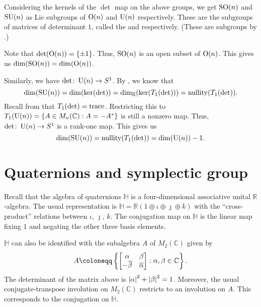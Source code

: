 \documentclass[12pt]{article}
\begin{document}
\begin{ex} \label{ex:special-orthogonal-unitary-groups-dimensions}
	Considering the kernels of the $\det$ map on the above groups, 
	we get $\operatorname{SO}(n)$ and $\operatorname{SU}(n)$ as Lie subgroups of $\operatorname{O}(n)$ 
	and $\operatorname{U}(n)$ respectively. 
	These are the subgroups of matrices of determinant $1$, called the  
	and  respectively. 
	(These are subgroups by .)

	Note that $\det(\operatorname{O}(n)) = \{\pm 1\}$. Thus, $\operatorname{SO}(n)$ is an open subset of $\operatorname{O}(n)$. 
	This gives us $\dim(\operatorname{SO}(n)) = \dim(\operatorname{O}(n))$.

	Similarly, we have $\det \colon \operatorname{U}(n) \to S^{1}$. 
	By , we know that
	\begin{equation*} 
		\dim(\operatorname{SU}(n)) = \dim(\ker(\det)) = \dim_{\mathbb{R}}(\ker(T_{1}(\det))) = \operatorname{nullity}(T_{1}(\det)).
	\end{equation*}
	Recall from  that $T_{1}(\det) = \operatorname{trace}$. 
	Restricting this to $T_{1}(\operatorname{U}(n)) = \{A \in M_{n}(\mathbb{C}) : A = -A^{\ast}\}$ is still a nonzero map. 
	Thus, $\det \colon \operatorname{U}(n) \to S^{1}$ is a rank-one map. This gives us
	\begin{equation*} 
		\dim(\operatorname{SU}(n)) = \operatorname{nullity}(T_{1}(\det)) = \dim(\operatorname{U}(n)) - 1.
	\end{equation*}
\end{ex}

\section{Quaternions and symplectic group} \label{sec:sympletic-group}

Recall that the algebra of quaternions $\mathbb{H}$ is a four-dimensional associative unital $\mathbb{R}$-algebra. 
The usual representation is $\mathbb{H} = \mathbb{R}(1 \oplus \iota \oplus \jmath \oplus k)$ with the ``cross-product'' relations between $\iota$, $\jmath$, $k$. 
The conjugation map on $\mathbb{H}$ is the linear map fixing $1$ and negating the other three basis elements.

$\mathbb{H}$ can also be identified with the subalgebra $A$ of $M_{2}(\mathbb{C})$ given by
\begin{equation*} 
	A \coloneqq 
	\left\{\two{\alpha}{\beta}{-\overline{\beta}}{\overline{\alpha}} : \alpha, \beta \in \mathbb{C}\right\}.
\end{equation*}
The determinant of the matrix above is ${\left\lvert \alpha \right\lvert}^{2} + {\left\lvert \beta \right\lvert}^{2} = 1$. 
Moreover, the usual conjugate-transpose involution on $M_{2}(\mathbb{C})$ restricts to an involution on $A$. 
This corresponds to the conjugation on $\mathbb{H}$.
\end{document}
